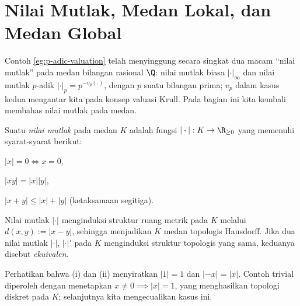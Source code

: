 \section{Nilai Mutlak, Medan Lokal, dan Medan Global}\label{sec:absolute-value}
Contoh \ref{eg:p-adic-valuation} telah menyinggung secara singkat dua macam ``nilai mutlak'' pada medan bilangan rasional $\Q$: nilai mutlak biasa $|\cdot|_\infty$ dan nilai mutlak $p$-adik $|\cdot|_p = p^{-v_p(\cdot)}$, dengan $p$ suatu bilangan prima; $v_p$ dalam kasus kedua mengantar kita pada konsep valuasi Krull. Pada bagian ini kita kembali membahas nilai mutlak pada medan.

\begin{definition}
	Suatu \emph{nilai mutlak} pada medan $K$ adalah fungsi $|\cdot|: K \to \R_{\geq 0}$ yang memenuhi syarat-syarat berikut:
	\begin{compactenum}[(i)]
		\item $|x|=0 \iff x=0$,
		\item $|xy|=|x| |y|$,
		\item $|x+y| \leq |x|+|y|$ (ketaksamaan segitiga).
	\end{compactenum}
	Nilai mutlak $|\cdot|$ menginduksi struktur ruang metrik pada $K$ melalui $d(x,y) := |x-y|$, sehingga menjadikan $K$ medan topologis Hausdorff. Jika dua nilai mutlak $|\cdot|$, $|\cdot|'$ pada $K$ menginduksi struktur topologis yang sama, keduanya disebut \emph{ekuivalen}.
\end{definition}
Perhatikan bahwa (i) dan (ii) menyiratkan $|1|=1$ dan $|-x|=|x|$. Contoh trivial diperoleh dengan menetapkan $x \neq 0 \implies |x|=1$, yang menghasilkan topologi diskret pada $K$; selanjutnya kita mengecualikan kasus ini.

